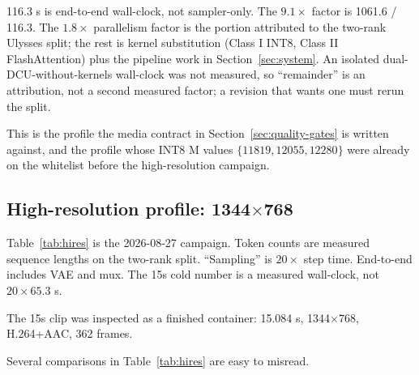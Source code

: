 \documentclass[11pt]{article}
\begin{document}
116.3 s is end-to-end wall-clock, not sampler-only. The $9.1\times$ factor is 1061.6 / 116.3. The $1.8\times$ parallelism factor is the portion attributed to the two-rank Ulysses split; the rest is kernel substitution (Class I INT8, Class II FlashAttention) plus the pipeline work in Section~\ref{sec:system}. An isolated dual-DCU-without-kernels wall-clock was not measured, so ``remainder'' is an attribution, not a second measured factor; a revision that wants one must rerun the split.

This is the profile the media contract in Section~\ref{sec:quality-gates} is written against, and the profile whose INT8 M values $\{11819, 12055, 12280\}$ were already on the whitelist before the high-resolution campaign.

\subsection{\texorpdfstring{High-resolution profile: 1344$\times$768}{High-resolution profile: 1344x768}}
\label{sec:hires}

Table~\ref{tab:hires} is the 2026-08-27 campaign. Token counts are measured sequence lengths on the two-rank split. ``Sampling'' is $20 \times$ step time. End-to-end includes VAE and mux. The 15s cold number is a measured wall-clock, not $20 \times 65.3$ s.

\begin{table}[htbp]
\centering
\caption{1344$\times$768, dual DCU, 20 steps.}
\label{tab:hires}
\scriptsize
\setlength{\tabcolsep}{3pt}
\end{table}

The 15s clip was inspected as a finished container: 15.084 s, 1344$\times$768, H.264+AAC, 362 frames.

Several comparisons in Table~\ref{tab:hires} are easy to misread.
\end{document}
